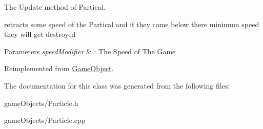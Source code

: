 The Update method of Partical. 

retracts some speed of the Partical and if they come below there minimum speed they will get destroyed 
\begin{DoxyParams}{Parameters}
{\em speed\+Modifier} & \+: The Speed of The Game \\
\hline
\end{DoxyParams}


Reimplemented from \hyperlink{class_game_object_acf6423054877d1344b6e0b1f4e740df5}{Game\+Object}.



The documentation for this class was generated from the following files\+:\begin{DoxyCompactItemize}
\item 
game\+Objects/Particle.\+h\item 
game\+Objects/Particle.\+cpp\end{DoxyCompactItemize}
